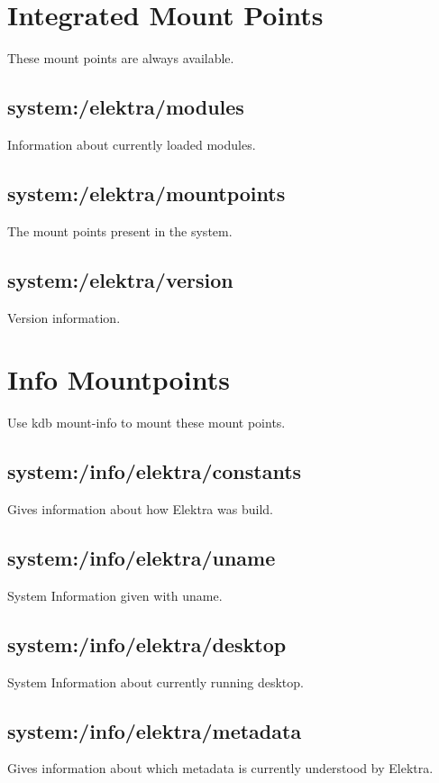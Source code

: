\hypertarget{doc_help_elektra-hierarchy_md_autotoc_md1666}{}\section{Integrated Mount Points}\label{doc_help_elektra-hierarchy_md_autotoc_md1666}
These mount points are always available.\hypertarget{doc_help_elektra-hierarchy_md_autotoc_md1667}{}\subsection{system\+:/elektra/modules}\label{doc_help_elektra-hierarchy_md_autotoc_md1667}
Information about currently loaded modules.\hypertarget{doc_help_elektra-hierarchy_md_autotoc_md1668}{}\subsection{system\+:/elektra/mountpoints}\label{doc_help_elektra-hierarchy_md_autotoc_md1668}
The mount points present in the system.\hypertarget{doc_help_elektra-hierarchy_md_autotoc_md1669}{}\subsection{system\+:/elektra/version}\label{doc_help_elektra-hierarchy_md_autotoc_md1669}
Version information.\hypertarget{doc_help_elektra-hierarchy_md_autotoc_md1670}{}\section{Info Mountpoints}\label{doc_help_elektra-hierarchy_md_autotoc_md1670}
Use {\ttfamily kdb mount-\/info} to mount these mount points.\hypertarget{doc_help_elektra-hierarchy_md_autotoc_md1671}{}\subsection{system\+:/info/elektra/constants}\label{doc_help_elektra-hierarchy_md_autotoc_md1671}
Gives information about how Elektra was build.\hypertarget{doc_help_elektra-hierarchy_md_autotoc_md1672}{}\subsection{system\+:/info/elektra/uname}\label{doc_help_elektra-hierarchy_md_autotoc_md1672}
System Information given with {\ttfamily uname}.\hypertarget{doc_help_elektra-hierarchy_md_autotoc_md1673}{}\subsection{system\+:/info/elektra/desktop}\label{doc_help_elektra-hierarchy_md_autotoc_md1673}
System Information about currently running desktop.\hypertarget{doc_help_elektra-hierarchy_md_autotoc_md1674}{}\subsection{system\+:/info/elektra/metadata}\label{doc_help_elektra-hierarchy_md_autotoc_md1674}
Gives information about which metadata is currently understood by Elektra.

